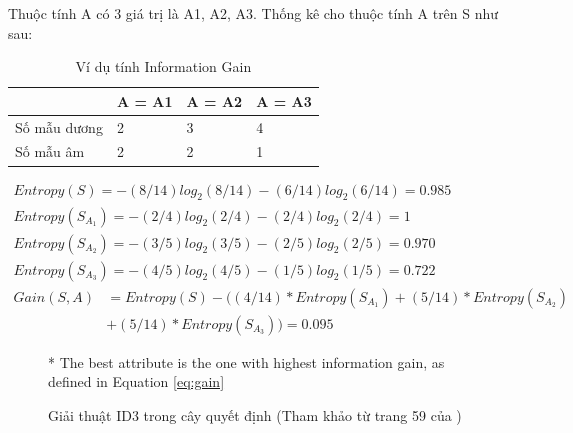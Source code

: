 \documentclass[12pt]{extarticle}
\begin{document}
\begin{itemize}
{\begin{itemize}
{						Thuộc tính A có 3 giá trị là A1, A2, A3. Thống kê cho thuộc tính A trên S như sau:
						\begin{table}[H]
							\centering							
							\label{my-label}
							\begin{tabular}{|l|l|l|l|}
							\hline
							             & A = A1 & A = A2 & A = A3 \\ \hline
							Số mẫu dương & 2      & 3      & 4      \\ \hline
							Số mẫu âm    & 2      & 2      & 1      \\ \hline
							\end{tabular}
							\caption{Ví dụ tính Information Gain}
						\end{table}
						$\begin{aligned}							
							Entropy(S) = -(8/14)log_{2}(8/14) - (6/14)log_{2}(6/14) = 0.985				
						\end{aligned}$	
						\\
						$\begin{aligned}							
							Entropy(S_{A_1}) = -(2/4)log_{2}(2/4) - (2/4)log_{2}(2/4) = 1				
						\end{aligned}$	
						\\
						$\begin{aligned}							
							Entropy(S_{A_2}) = -(3/5)log_{2}(3/5) - (2/5)log_{2}(2/5) = 0.970
						\end{aligned}$
						\\
						$\begin{aligned}							
							Entropy(S_{A_3}) = -(4/5)log_{2}(4/5) - (1/5)log_{2}(1/5) = 0.722
						\end{aligned}$	
						\\						
						\begin{align*}							
					    	Gain(S,A) &= Entropy(S) - ((4/14)*Entropy(S_{A_1}) + (5/14)*Entropy(S_{A_2}) \\
					    	&+ (5/14)*Entropy(S_{A_3})) = 0.095					    	
						\end{align*}														
						}						
					\end{itemize}}					
				\end{itemize}
				\begin{figure}[H]
					\centering
					
					* The best attribute is the one with highest information gain, as defined in Equation 
					\ref{eq:gain}
					\caption{Giải thuật ID3 trong cây quyết định (Tham khảo từ trang 59 của \cite{mltextbook})}
					\label{fig:id3}
				\end{figure}
\end{document}
